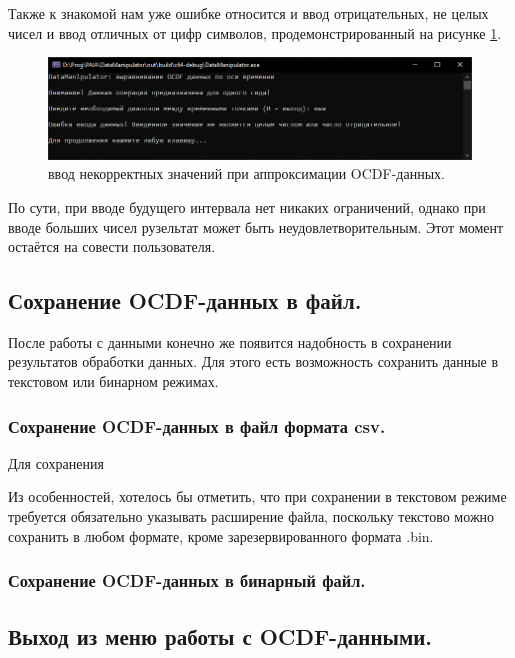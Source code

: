 {\standartFont

  \par Также к знакомой нам уже ошибке относится и ввод отрицательных, не целых чисел и ввод отличных от цифр символов, продемонстрированный на рисунке \ref{fig:OCDFapprerr1}.

  \begin{figure}[H]
    \centering
    \includegraphics[width=\textwidth]{images/forDataManipulator/OCDFApprErr1.png}
    \caption{ввод некорректных значений при аппроксимации OCDF-данных.} 
    \label{fig:OCDFapprerr1}
  \end{figure}

  \par По сути, при вводе будущего интервала нет никаких ограничений, однако при вводе больших чисел рузельтат может быть неудовлетворительным. Этот момент остаётся на совести пользователя. 

  \par 
}

\subsection{ \standartTitleFont
  Сохранение OCDF-данных в файл.
}

{\standartFont

  \par После работы с данными конечно же появится надобность в сохранении результатов обработки данных. Для этого есть возможность сохранить данные в текстовом или бинарном режимах. 

  \par 
}

\subsubsection{ \standartTitleFont
  Сохранение OCDF-данных в файл формата csv.
}

{\standartFont

  \par Для сохранения 

  \par Из особенностей, хотелось бы отметить, что при сохранении в текстовом режиме требуется обязательно указывать расширение файла, поскольку текстово можно сохранить в любом формате, кроме зарезервированного формата .bin. 
}

\subsubsection{ \standartTitleFont
  Сохранение OCDF-данных в бинарный файл.
}

\subsection{ \standartTitleFont
  Выход из меню работы с OCDF-данными.
}